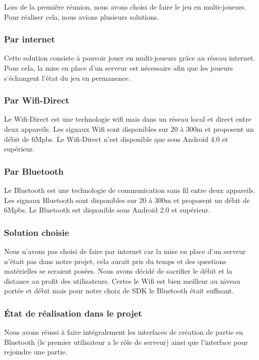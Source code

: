 \documentclass{report}
\begin{document}
Lors de la première réunion, nous avons choisi de faire le jeu en
multi-joueurs. Pour réaliser cela, nous avions plusieurs solutions.

\subsubsection{Par internet}

Cette solution consiste à pouvoir jouer en multi-joueurs grâce au réseau
internet. Pour cela, la mise en place d’un serveur est nécessaire afin
que les joueurs s’échangent l’état du jeu en permanence.

\subsubsection{Par Wifi-Direct}

Le Wifi-Direct est une technologie wifi mais dans un réseau local et
direct entre deux appareils. Les signaux Wifi sont disponibles sur 20
à 300m et proposent un débit de 6Mpbs.
Le Wifi-Direct n’est disponible que sous Android 4.0 et supérieur.

\subsubsection{Par Bluetooth}

Le Bluetooth est une technologie de communication sans fil entre deux
appareils. Les signaux Bluetooth sont disponibles sur 20 à 300m et
proposent un débit de 6Mpbs.
Le Bluetooth est disponible sous Android 2.0 et supérieur.

\subsubsection{Solution choisie}

Nous n’avons pas choisi de faire par internet car la mise en place d’un
serveur n’était pas dans notre projet, cela aurait pris du temps et des
questions matérielles se seraient posées. Nous avons décidé de sacrifier
le débit et la distance au profit des utilisateurs. Certes le Wifi est
bien meilleur au niveau portée et débit mais pour notre choix de SDK le
Bluetooth était suffisant.

\subsubsection{État de réalisation dans le projet}

Nous avons réussi à faire intégralement les interfaces de création de
partie en Bluetooth (le premier utilisateur a le rôle de serveur) ainsi
que l’interface pour rejoindre une partie.
\end{document}
